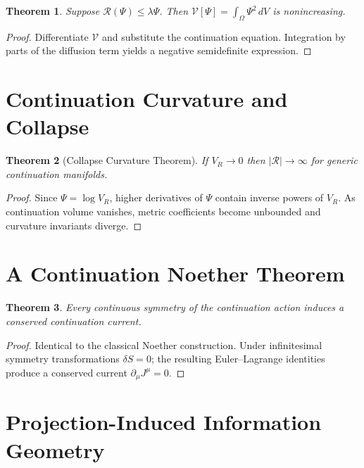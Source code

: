 \documentclass[12pt,a4paper]{article}
\newtheorem{theorem}{Theorem}[section]
\begin{document}
\begin{theorem}
Suppose $\mathcal{R}(\Psi) \le \lambda\Psi$. Then $\mathcal{V}[\Psi] = \int_\Omega \Psi^2\, dV$ is nonincreasing.
\end{theorem}

\begin{proof}
Differentiate $\mathcal{V}$ and substitute the continuation equation. Integration by parts of the diffusion term yields a negative semidefinite expression.
\end{proof}

\section{Continuation Curvature and Collapse}

\begin{theorem}[Collapse Curvature Theorem]
If $V_R \to 0$ then $|\mathcal{R}| \to \infty$ for generic continuation manifolds.
\end{theorem}

\begin{proof}
Since $\Psi = \log V_R$, higher derivatives of $\Psi$ contain inverse powers of $V_R$. As continuation volume vanishes, metric coefficients become unbounded and curvature invariants diverge.
\end{proof}

\section{A Continuation Noether Theorem}

\begin{theorem}
Every continuous symmetry of the continuation action induces a conserved continuation current.
\end{theorem}

\begin{proof}
Identical to the classical Noether construction. Under infinitesimal symmetry transformations $\delta S = 0$; the resulting Euler--Lagrange identities produce a conserved current $\partial_\mu J^\mu = 0$.
\end{proof}

\section{Projection-Induced Information Geometry}
\end{document}
